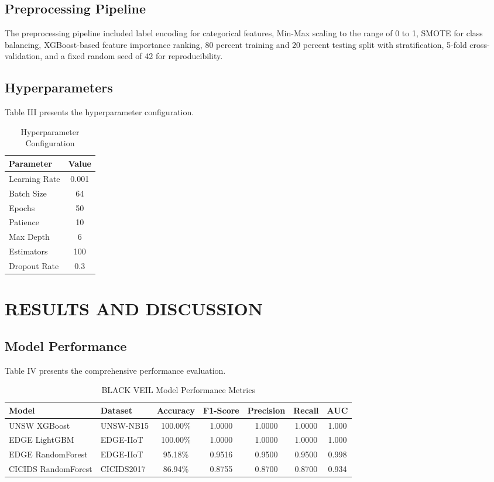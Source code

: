\documentclass[12pt]{article}
\begin{document}
\subsection{Preprocessing Pipeline}
The preprocessing pipeline included label encoding for categorical features, Min-Max scaling to the range of 0 to 1, SMOTE for class balancing, XGBoost-based feature importance ranking, 80 percent training and 20 percent testing split with stratification, 5-fold cross-validation, and a fixed random seed of 42 for reproducibility.

\subsection{Hyperparameters}
Table III presents the hyperparameter configuration.

\begin{table}[H]
\centering
\caption{Hyperparameter Configuration}
\begin{tabular}{|l|c|}
\hline
\textbf{Parameter} & \textbf{Value} \\
\hline
Learning Rate & 0.001 \\
Batch Size & 64 \\
Epochs & 50 \\
Patience & 10 \\
Max Depth & 6 \\
Estimators & 100 \\
Dropout Rate & 0.3 \\
\hline
\end{tabular}
\label{tab:hyperparameters}
\end{table}

\newpage

\section{RESULTS AND DISCUSSION}

\subsection{Model Performance}
Table IV presents the comprehensive performance evaluation.

\begin{table}[H]
\centering
\caption{BLACK VEIL Model Performance Metrics}
\small
\begin{tabular}{|l|l|c|c|c|c|c|}
\hline
\textbf{Model} & \textbf{Dataset} & \textbf{Accuracy} & \textbf{F1-Score} & \textbf{Precision} & \textbf{Recall} & \textbf{AUC} \\
\hline
UNSW XGBoost & UNSW-NB15 & 100.00\% & 1.0000 & 1.0000 & 1.0000 & 1.000 \\
EDGE LightGBM & EDGE-IIoT & 100.00\% & 1.0000 & 1.0000 & 1.0000 & 1.000 \\
EDGE RandomForest & EDGE-IIoT & 95.18\% & 0.9516 & 0.9500 & 0.9500 & 0.998 \\
CICIDS RandomForest & CICIDS2017 & 86.94\% & 0.8755 & 0.8700 & 0.8700 & 0.934 \\
\hline
\end{tabular}
\label{tab:performance}
\end{table}
\end{document}
